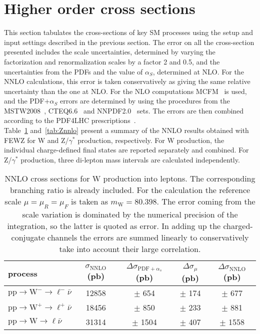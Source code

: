 \section{Higher order cross sections}
\label{sec:results}

This section tabulates the cross-sections of key SM processes using the setup
and input settings described in the previous section.
The error on all the cross-section presented includes the 
scale uncertainties, determined by varying the factorization and renormalization 
scales by a factor 2 and 0.5, and the uncertainties from the PDFs and the value 
of $\alpha_S$, determined at NLO. For the NNLO calculations, this error is taken
conservatively as giving the same relative uncertainty than the one at NLO.
For the NLO computations MCFM~\cite{mcfm:w} is used, and the PDF+$\alpha_S$ 
errors are determined by using the procedures from the MSTW2008~\cite{mstw08}, 
CTEQ6.6~\cite{cteq66} and NNPDF2.0~\cite{nnpdf} sets. The errors are then 
combined according to the PDF4LHC prescriptions~\cite{pdf4lhc}. \\
Table~\ref{tab:Wnnlo} and~\ref{tab:Znnlo} present a summary of the NNLO results 
obtained with FEWZ for W and Z/$\gamma^{*}$ production, respectively.
For W production, the individual charge-defined final states are reported 
separately and combined. For Z/$\gamma^{*}$ production, three di-lepton mass 
intervals are calculated independently.  \\

\begin{table}[htb]
  \begin{center}
    \begin{tabular}{|l|c|c|c|c|}
      \hline
      
      process & $\sigma_{\mathrm{NNLO}}$ (pb) & $\Delta\sigma_{\mathrm{PDF}+\alpha_s}$ (pb) & $\Delta\sigma_{\mu}$ (pb) & $\Delta\sigma_{\mathrm{NNLO}}$ (pb) \\
      \hline
      $\mathrm{pp}\to\mathrm{W}^-\to{\ell^-\bar{\nu}}$ & 12858 & $\pm$ 654 & $\pm$ 174 & $\pm$ 677 \\
      $\mathrm{pp}\to\mathrm{W}^+\to{\ell^+\bar{\nu}}$ & 18456 & $\pm$ 850 & $\pm$ 233 & $\pm$ 881 \\
      \hline
      $\mathrm{pp}\to\mathrm{W}\to{\ell\bar{\nu}}$ & 31314 & $\pm$ 1504 & $\pm$ 407 & $\pm$ 1558 \\
      \hline
 
    \end{tabular}
    \caption{NNLO cross sections for W production into leptons. The corresponding branching 
      ratio is already included. For the calculation the reference scale $\mu=\mu_R=\mu_F$ 
      is taken as $m_\mathrm{W}=80.398$. 
      The error coming from the scale variation is dominated by the numerical precision 
      of the integration, so the latter is quoted as error.  
      In adding up the charged-conjugate channels the errors are summed linearly to 
      conservatively take into account their large correlation.\label{tab:Wnnlo}}
  \end{center}
\end{table} 

